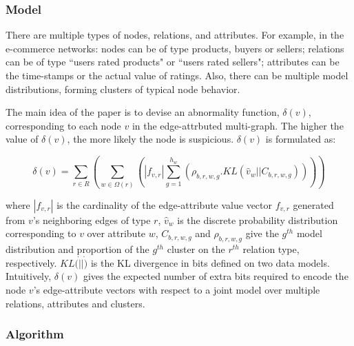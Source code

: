 \documentclass[11pt, oneside]{article}   	%
\begin{document}
\subsubsection*{Model}

\quad There are multiple types of nodes, relations, and attributes.
For example, in the e-commerce networks: nodes can be of type products, buyers or sellers; relations can be of type ``users rated products" or ``users rated sellers"; attributes can be the time-stamps or the actual value of ratings.
Also, there can be multiple model distributions, forming clusters of typical node behavior.

\quad The main idea of the paper is to devise an abnormality function, $\delta(v)$, corresponding to each node $v$ in the edge-attrbuted multi-graph.
The higher the value of $\delta(v)$, the more likely the node is suspicious.
$\delta(v)$ is formulated as:

\begin{equation*}
\delta(v) = \sum_{r\in R} \left( \sum_{w \in \Omega(r)} \left(|f_{v,r}|\sum_{g=1}^{h_w} \left( \rho_{b,r,w,g}. KL(\hat{v}_w || C_{b,r,w,g})\right) \right)\right)
\end{equation*}

where $|f_{v,r}|$ is the cardinality of the edge-attribute value vector $f_{v,r}$ generated from $v$'s neighboring edges of type $r$, $\hat{v}_w$ is the discrete probability distribution corresponding to $v$ over attribute $w$, $C_{b,r,w,g}$ and $\rho_{b,r,w,g}$ give the $g^{th}$ model distribution and proportion of the $g^{th}$ cluster on the $r^{th}$ relation type, respectively.
$KL(\dot || \dot)$ is the KL divergence in bits defined on two data models.
Intuitively, $\delta(v)$ gives the expected number of extra bits required to encode the node $v$’s edge-attribute vectors with respect to a joint model over multiple relations, attributes and clusters.

\subsubsection*{Algorithm}
\end{document}
